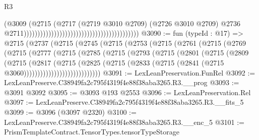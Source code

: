 \begin{lexlean}{R3}
\begin{coremodule}
                                                                                  (@3009
                                                                                    (@2715
                                                                                      (@2717
                                                                                        (@2719
                                                                                          @3010
                                                                                          @2709)
                                                                                        (@2726
                                                                                          @3010
                                                                                          @2709)
                                                                                        @2736
                                                                                        @2711))))))))))))))))))))))))))))))))))))))))))
@3090 := fun (typeId : @17) =>
  @2715
    (@2737
      (@2715
        (@2745
          (@2715
            (@2753
              (@2715
                (@2761
                  (@2715
                    (@2769
                      (@2715
                        (@2777
                          (@2715
                            (@2785
                              (@2715
                                (@2793
                                  (@2715
                                    (@2801
                                      (@2715
                                        (@2809
                                          (@2715
                                            (@2817
                                              (@2715
                                                (@2825
                                                  (@2715
                                                    (@2833
                                                      (@2715
                                                        (@2841
                                                          (@2715 @3060))))))))))))))))))))))))))))
@3091 := LexLeanPreservation.FunRel
@3092 := LexLeanPreserve.C38949fa2c795f4319f4e88f38aba3265.R3.__prog
@3093 := @3091 @3092
@3095 := @3093 @193 @2553
@3096 := LexLeanPreservation.Rel
@3097 := LexLeanPreserve.C38949fa2c795f4319f4e88f38aba3265.R3.__fits_5
@3099 := @3096 (@3097 @2320)
@3100 := LexLeanPreserve.C38949fa2c795f4319f4e88f38aba3265.R3.__enc_5
@3101 := PrismTemplateContract.TensorTypes.tensorTypeStorage

\end{coremodule}
\end{lexlean}
